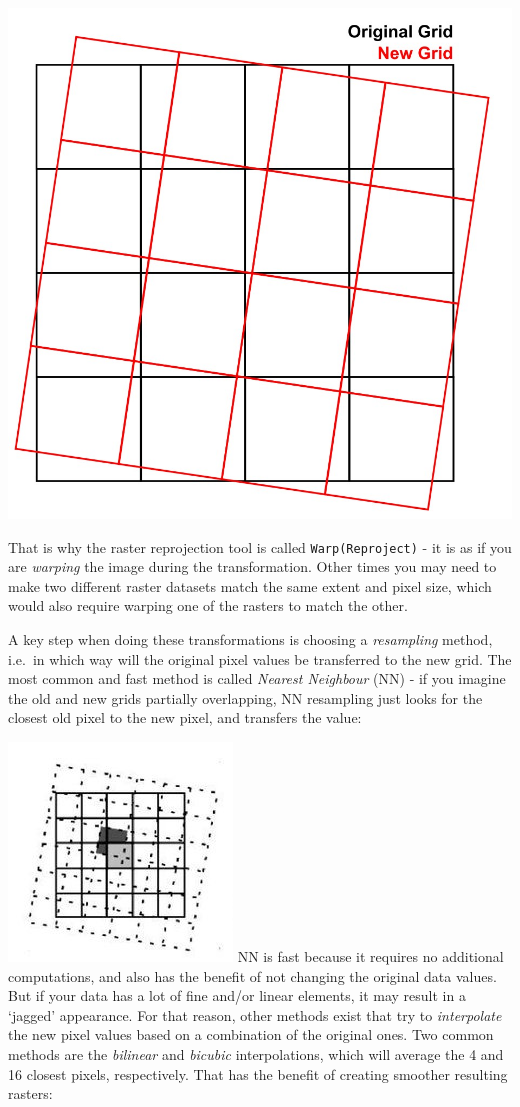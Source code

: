 \documentclass[
  letterpaper,
  DIV=11,
  numbers=noendperiod]{scrreprt}
\begin{document}
\includegraphics{images/lab_6/lab_6_fig14_mismatched_grids.jpg}

That is why the raster reprojection tool is called
\texttt{Warp(Reproject)} - it is as if you are \emph{warping} the image
during the transformation. Other times you may need to make two
different raster datasets match the same extent and pixel size, which
would also require warping one of the rasters to match the other.

A key step when doing these transformations is choosing a
\emph{resampling} method, i.e.~in which way will the original pixel
values be transferred to the new grid. The most common and fast method
is called \emph{Nearest Neighbour} (NN) - if you imagine the old and new
grids partially overlapping, NN resampling just looks for the closest
old pixel to the new pixel, and transfers the value:

\includegraphics{images/lab_6/lab_6_fig12_NN.jpg} NN is fast because it
requires no additional computations, and also has the benefit of not
changing the original data values. But if your data has a lot of fine
and/or linear elements, it may result in a `jagged' appearance. For that
reason, other methods exist that try to \emph{interpolate} the new pixel
values based on a combination of the original ones. Two common methods
are the \emph{bilinear} and \emph{bicubic} interpolations, which will
average the 4 and 16 closest pixels, respectively. That has the benefit
of creating smoother resulting rasters:
\end{document}
